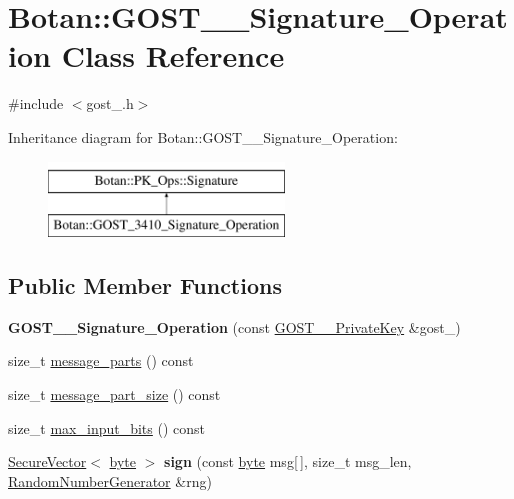\hypertarget{classBotan_1_1GOST__3410__Signature__Operation}{\section{Botan\-:\-:G\-O\-S\-T\-\_\-\_\-\-Signature\-\_\-\-Operation Class Reference}
\label{classBotan_1_1GOST__3410__Signature__Operation}
}


{\ttfamily \#include $<$gost\-\_.\-h$>$}

Inheritance diagram for Botan\-:\-:G\-O\-S\-T\-\_\-\_\-\-Signature\-\_\-\-Operation\-:\begin{figure}[H]
\begin{center}
\leavevmode
\includegraphics[height=2.000000cm]{classBotan_1_1GOST__3410__Signature__Operation}
\end{center}
\end{figure}
\subsection*{Public Member Functions}
\begin{DoxyCompactItemize}
\item 
\hypertarget{classBotan_1_1GOST__3410__Signature__Operation_a8225ef4392c4d37e44a891fda5a7e13b}{{\bfseries G\-O\-S\-T\-\_\-\_\-\-Signature\-\_\-\-Operation} (const \hyperlink{classBotan_1_1GOST__3410__PrivateKey}{G\-O\-S\-T\-\_\-\_\-\-Private\-Key} \&gost\-\_)}\label{classBotan_1_1GOST__3410__Signature__Operation_a8225ef4392c4d37e44a891fda5a7e13b}

\item 
size\-\_\-t \hyperlink{classBotan_1_1GOST__3410__Signature__Operation_a2767f276ebdadaf6111d74c4f68716af}{message\-\_\-parts} () const 
\item 
size\-\_\-t \hyperlink{classBotan_1_1GOST__3410__Signature__Operation_ad6e67d52834efdbf15091e32e762e155}{message\-\_\-part\-\_\-size} () const 
\item 
size\-\_\-t \hyperlink{classBotan_1_1GOST__3410__Signature__Operation_a127e6bafcf7575f4e78f2db717b8885a}{max\-\_\-input\-\_\-bits} () const 
\item 
\hypertarget{classBotan_1_1GOST__3410__Signature__Operation_a7341387480d77756870b225ef29a1d26}{\hyperlink{classBotan_1_1SecureVector}{Secure\-Vector}$<$ \hyperlink{namespaceBotan_a7d793989d801281df48c6b19616b8b84}{byte} $>$ {\bfseries sign} (const \hyperlink{namespaceBotan_a7d793989d801281df48c6b19616b8b84}{byte} msg\mbox{[}$\,$\mbox{]}, size\-\_\-t msg\-\_\-len, \hyperlink{classBotan_1_1RandomNumberGenerator}{Random\-Number\-Generator} \&rng)}\label{classBotan_1_1GOST__3410__Signature__Operation_a7341387480d77756870b225ef29a1d26}

\end{DoxyCompactItemize}


